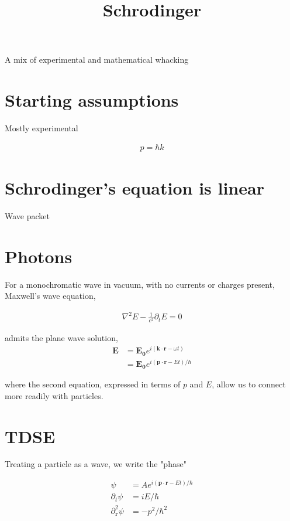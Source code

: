 \documentclass{article}
\title{Schrodinger}
\date{}
\begin{document}
\maketitle

A mix of experimental and mathematical whacking

\section{Starting assumptions}

Mostly experimental

\begin{align}
p = \hbar k
\end{align}

\section{Schrodinger's equation is linear}

Wave packet

\section{Photons}

For a monochromatic wave in vacuum, with no currents or charges present,
Maxwell’s wave equation,

\begin{align}
\nabla^2 E - \frac{1}{c^2} \partial_t{E} = 0
\end{align}

admits the plane wave solution, 
\begin{align}
\mathbf{E} &= \mathbf{E_0} e^{i(\mathbf{k \cdot r} - \omega t)} \\
           &= \mathbf{E_0} e^{i(\mathbf{p \cdot r} - E t) / \hbar}
\end{align}

where the second equation, expressed in terms of $p$ and $E$, allow us to connect more readily with particles.

\section{TDSE}

Treating a particle as a wave, we write the "phase"

\begin{align}
\psi &= A e^{i(\mathbf{p \cdot r} - E t) / \hbar} \\
\partial_t{\psi} &= i E / \hbar \\
\partial^2_\mathbf{r}{\psi} &= - p^2 / \hbar^2
\end{align}
\end{document}
